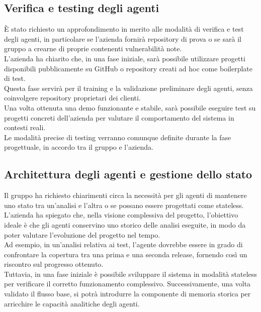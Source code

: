 \subsection{Verifica e testing degli agenti}
È stato richiesto un approfondimento in merito alle modalità di verifica e test degli agenti, in particolare se l’azienda fornirà repository di prova o se sarà il gruppo a crearne di proprie contenenti vulnerabilità note.\\
L’azienda ha chiarito che, in una fase iniziale, sarà possibile utilizzare progetti disponibili pubblicamente su GitHub o repository creati ad hoc come boilerplate di test.\\
Questa fase servirà per il training e la validazione preliminare degli agenti, senza coinvolgere repository proprietari dei clienti.\\
Una volta ottenuta una demo funzionante e stabile, sarà possibile eseguire test su progetti concreti dell’azienda per valutare il comportamento del sistema in contesti reali.\\
Le modalità precise di testing verranno comunque definite durante la fase progettuale, in accordo tra il gruppo e l’azienda.

\subsection{Architettura degli agenti e gestione dello stato}
Il gruppo ha richiesto chiarimenti circa la necessità per gli agenti di mantenere uno stato tra un’analisi e l’altra o se possano essere progettati come stateless.\\
L’azienda ha spiegato che, nella visione complessiva del progetto, l’obiettivo ideale è che gli agenti conservino uno storico delle analisi eseguite, in modo da poter valutare l’evoluzione del progetto nel tempo.\\
Ad esempio, in un’analisi relativa ai test, l’agente dovrebbe essere in grado di confrontare la copertura tra una prima e una seconda release, fornendo così un riscontro sul progresso ottenuto.\\
Tuttavia, in una fase iniziale è possibile sviluppare il sistema in modalità stateless per verificare il corretto funzionamento complessivo. Successivamente, una volta validato il flusso base, si potrà introdurre la componente di memoria storica per arricchire le capacità analitiche degli agenti.


